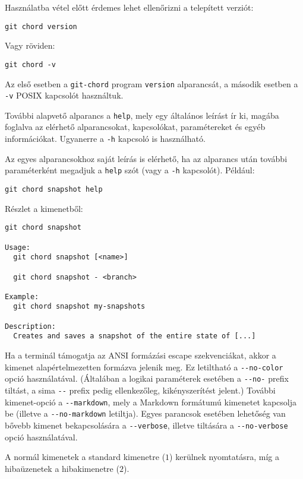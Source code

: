 \documentclass[
]{elteikthesis}[2025/03/25]
\begin{document}
Használatba vétel előtt érdemes lehet ellenőrizni a telepített verziót:

\begin{verbatim}
git chord version
\end{verbatim}

Vagy röviden:

\begin{verbatim}
git chord -v
\end{verbatim}

Az első esetben a \verb|git-chord| program \texttt{version} alparancsát,
a második esetben a \verb|-v| POSIX kapcsolót használtuk.

További alapvető alparancs a \verb|help|, mely egy általános leírást ír ki,
magába foglalva az elérhető alparancsokat, kapcsolókat, paramétereket és egyéb információkat.
Ugyanerre a \verb|-h| kapcsoló is használható.

Az egyes alparancsokhoz saját leírás is elérhető,
ha az alparancs után további paraméterként megadjuk a \verb|help| szót
(vagy a \verb|-h| kapcsolót).
Például:

\begin{verbatim}
git chord snapshot help
\end{verbatim}

Részlet a kimenetből:

\begin{verbatim}
git chord snapshot

Usage:
  git chord snapshot [<name>]

  git chord snapshot - <branch>

Example:
  git chord snapshot my-snapshots

Description:
  Creates and saves a snapshot of the entire state of [...]
\end{verbatim}

Ha a terminál támogatja az ANSI formázási escape szekvenciákat,
akkor a kimenet alapértelmezetten formázva jelenik meg.
Ez letiltható a \verb|--no-color| opció használatával.
(Általában a logikai paraméterek esetében a \verb|--no-| prefix tiltást,
a sima \verb|--| prefix pedig ellenkezőleg, kikényszerítést jelent.)
További kimenet-opció a \verb|--markdown|, mely a Markdown formátumú kimenetet kapcsolja be (illetve a \verb|--no-markdown| letiltja).
Egyes parancsok esetében lehetőség van bővebb kimenet bekapcsolására a \verb|--verbose|,
illetve tiltására a \verb|--no-verbose| opció használatával.

A normál kimenetek a standard kimenetre ($1$) kerülnek nyomtatásra,
míg a hibaüzenetek a hibakimenetre ($2$).
\end{document}
